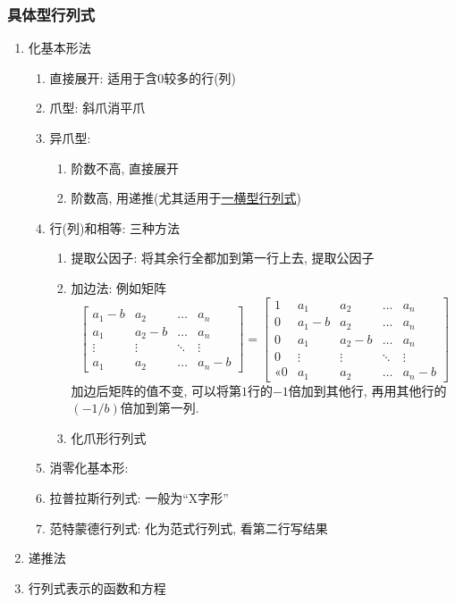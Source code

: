 \subsubsection{具体型行列式}
\begin{enumerate}
\item 化基本形法
\begin{enumerate}
\item 直接展开: 适用于含$ 0 $较多的行(列)
\item 爪型: 斜爪消平爪
\item 异爪型:
\begin{enumerate}
\item 阶数不高, 直接展开
\item 阶数高, 用递推(尤其适用于\hyperref[一横型行列式]{一横型行列式})\par
\end{enumerate}
\item 行(列)和相等: 三种方法
\begin{enumerate}
\item 提取公因子: 将其余行全都加到第一行上去, 提取公因子
\item 加边法: 例如矩阵
\begin{equation*}
\begin{bmatrix}
a_{1}-b & a_{2} & \dots & a_{n} \\
a_{1} & a_{2}-b & \dots & a_{n} \\
\vdots & \vdots & \ddots & \vdots \\
a_{1} & a_{2} & \dots & a_{n}-b
\end{bmatrix}=
\begin{bmatrix}
1 & a_{1} & a_{2} & \dots & a_{n} \\
0 & a_{1}-b & a_{2} & \dots & a_{n} \\
0 & a_{1} & a_{2}-b & \dots & a_{n} \\
0 & \vdots & \vdots & \ddots & \vdots \\«
0 & a_{1} & a_{2} & \dots & a_{n}-b
\end{bmatrix}
\end{equation*}加边后矩阵的值不变, 可以将第$ 1 $行的$ -1 $倍加到其他行, 再用其他行的$ (-1/b) $倍加到第一列.
\item 化爪形行列式
\end{enumerate}
\item 消零化基本形:
\item 拉普拉斯行列式: 一般为``X字形''
\item 范特蒙德行列式: 化为范式行列式, 看第二行写结果
\end{enumerate}
\item 递推法
\item 行列式表示的函数和方程
\end{enumerate}
